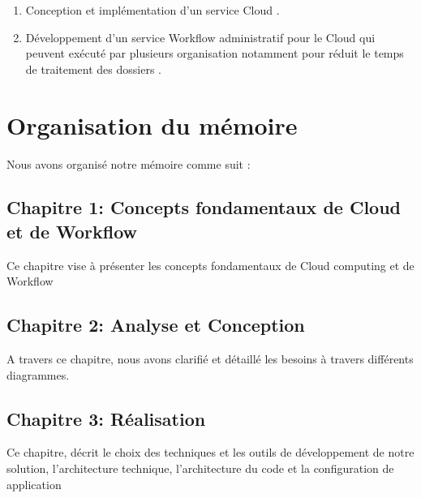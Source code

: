 \begin{enumerate}
\item Conception et implémentation d'un service Cloud .
 
\item Développement d'un service Workflow administratif  pour le Cloud qui peuvent exécuté par plusieurs  organisation notamment pour réduit le temps de traitement des dossiers .  
\end{enumerate}


\section*{Organisation du mémoire}

Nous avons organisé notre mémoire comme suit : 
\subsection*{Chapitre 1: Concepts fondamentaux de Cloud et de Workflow} 

Ce chapitre vise à présenter les concepts fondamentaux de Cloud computing  et de Workflow 
\subsection*{Chapitre 2: Analyse et Conception} 
A travers ce chapitre, nous avons clarifié et détaillé les besoins à travers différents diagrammes. 
\subsection*{Chapitre 3: Réalisation}


Ce chapitre, décrit le choix des techniques et les outils de développement de notre solution, l’architecture technique, l’architecture du code et la configuration de application 
